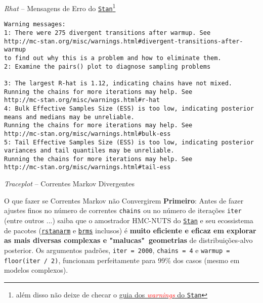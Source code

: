 \begin{frame}[fragile]{\textit{Rhat} -- Mensagens de Erro do \href{https://mc-stan.org}{\texttt{Stan}}\footnote{além disso não deixe de checar o \href{https://mc-stan.org/misc/warnings.html}{guia dos \textcolor{red}{\textit{warnings}} do \texttt{Stan}}}}
  \begin{lstlisting}[basicstyle=\footnotesize\color{red}]
Warning messages:
1: There were 275 divergent transitions after warmup. See
http://mc-stan.org/misc/warnings.html#divergent-transitions-after-warmup
to find out why this is a problem and how to eliminate them.
2: Examine the pairs() plot to diagnose sampling problems

3: The largest R-hat is 1.12, indicating chains have not mixed.
Running the chains for more iterations may help. See
http://mc-stan.org/misc/warnings.html#r-hat
4: Bulk Effective Samples Size (ESS) is too low, indicating posterior
means and medians may be unreliable.
Running the chains for more iterations may help. See
http://mc-stan.org/misc/warnings.html#bulk-ess
5: Tail Effective Samples Size (ESS) is too low, indicating posterior
variances and tail quantiles may be unreliable.
Running the chains for more iterations may help. See
http://mc-stan.org/misc/warnings.html#tail-ess
  \end{lstlisting}
\end{frame}

\begin{frame}{\textit{Traceplot} -- Correntes Markov Divergentes}
  \begin{figure}
    \centering
    \resizebox{.4\linewidth}{!}{}
  \end{figure}
\end{frame}

\begin{frame}{O que fazer se Correntes Markov não Convergirem}
  \textbf{Primeiro}: Antes de fazer ajustes finos no número de correntes
  \texttt{chains} ou no número de iterações \texttt{iter} (entre outros ...)
  saiba que o amostrador HMC-NUTS do \href{https://mc-stan.org}{\texttt{Stan}} e
  seu ecossistema de pacotes (\href{http://mc-stan.org/rstanarm/}{\texttt{rstanarm}} e
  \href{https://paul-buerkner.github.io/brms/}{\texttt{brms}} inclusos) é \textbf{muito
  eficiente e eficaz em explorar as mais diversas complexas e "malucas"~geometrias}
  de distribuições-alvo posterior.
  \vfill
  Os argumentos padrões, \texttt{iter = 2000}, \texttt{chains = 4} e
  \texttt{warmup = floor(iter / 2)}, funcionam perfeitamente para 99\% dos casos
  (mesmo em modelos complexos).
\end{frame}

